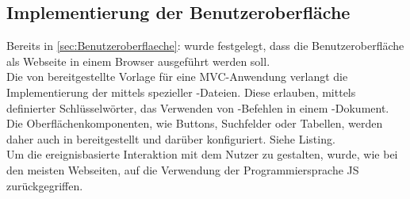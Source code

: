 \subsection{Implementierung der Benutzeroberfläche}
\label{sec:ImplementierungBenutzeroberflaeche}
Bereits in \ref{sec:Benutzeroberflaeche}:  wurde festgelegt, dass die Benutzeroberfläche
als Webseite in einem Browser ausgeführt werden soll.\\
Die von  bereitgestellte Vorlage für eine \ac{MVC}-Anwendung verlangt
die Implementierung der  mittels spezieller -Dateien.
Diese erlauben, mittels definierter Schlüsselwörter, das Verwenden von -Befehlen in einem
-Dokument. Die Oberflächenkomponenten, wie \zB Buttons, Suchfelder oder Tabellen, werden
daher auch in  bereitgestellt und darüber konfiguriert. Siehe Listing.\\
Um die ereignisbasierte Interaktion mit dem Nutzer zu gestalten, wurde, wie bei den meisten Webseiten,
auf die Verwendung der Programmiersprache \acs{JS} zurückgegriffen.

